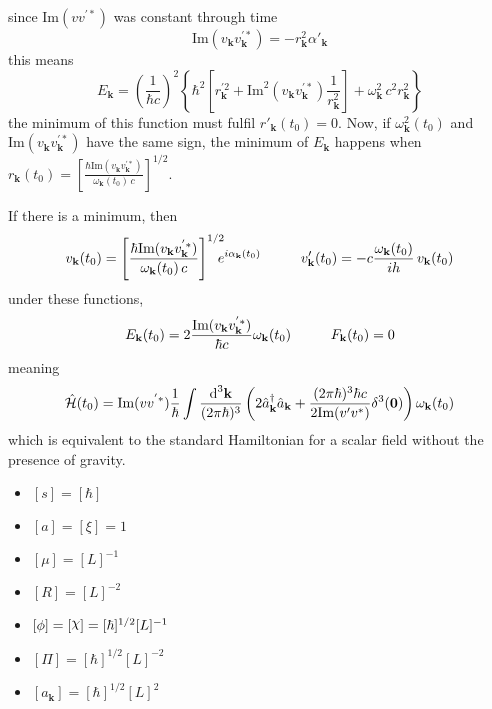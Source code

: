 \documentclass[pt=11, openany,twoside,a4paper]{scrbook}
\DeclareRobustCommand{\rchi}{{\mathpalette\irchi\relax}}
\newcommand{\irchi}[2]{\raisebox{\depth}{$#1\chi$}} %
\begin{document}
	since Im$(vv^{'*})$ was constant through time
	\begin{equation}
		\text{Im}(v_\mathbf{k}v^{'*}_\mathbf{k})=-r_\mathbf{k}^2\alpha'_\mathbf{k}
	\end{equation}
	this means
	\begin{equation}
		E_\mathbf{k}=\left(\frac{1}{\hbar c}\right)^2\left\{\hbar^2\left[r^{'2}_\mathbf{k}+\text{Im}^2\left(v_\mathbf{k}v^{'*}_\mathbf{k}\right)\frac{1}{r_\mathbf{k}^2}\right]+\omega^2_\mathbf{k}\,c^2r_\mathbf{k}^2\right\}
	\end{equation}
	the minimum of this function must fulfil $r'_\mathbf{k}(t_0)=0$. Now, if $\omega_\mathbf{k}^2(t_0)$ and $\text{Im}(v_\mathbf{k}v^{'*}_\mathbf{k})$ have the same sign, the minimum of $E_\mathbf{k}$ happens when $r_\mathbf{k}(t_0)=\left[\frac{\hbar\text{Im}(v_\mathbf{k}v^{'*}_\mathbf{k})}{\omega_\mathbf{k}(t_0)\,c}\right]^{1/2}$.
	
	If there is a minimum, then
	\begin{equation}
		v_\mathbf{k}(t_0)=\left[\frac{\hbar\text{Im}(v_\mathbf{k}v^{'*}_\mathbf{k})}{\omega_\mathbf{k}(t_0)\,c}\right]^{1/2}\!\!\!\!e^{i\alpha_\mathbf{k}(t_0)}\hspace{1.0cm}v'_\mathbf{k}(t_0)=-c\frac{\omega_\mathbf{k}(t_0)}{ih}\,v_\mathbf{k}(t_0)
	\end{equation}
	under these functions,
	\begin{equation}
		E_\mathbf{k}(t_0)=2\frac{\text{Im}(v_\mathbf{k}v^{'*}_\mathbf{k})}{\hbar c}\omega_\mathbf{k}(t_0)\hspace{1.0cm}F_\mathbf{k}(t_0)=0
	\end{equation}
	meaning
	\begin{equation}
		\hat{\mathcal{H}}(t_0)=\text{Im}(vv^{'*})\frac{1}{\hbar}\int\frac{\text{d}^3\mathbf{k}}{(2\pi\hbar)^3}\left(2\hat{a}_\mathbf{k}^\dagger\hat{a}_\mathbf{k}+\frac{(2\pi\hbar)^3\hbar c}{2\text{Im}(v'v^*)}\delta^3(\mathbf{0})\right)\omega_\mathbf{k}(t_0)
	\end{equation}
	which is equivalent to the standard Hamiltonian for a scalar field without the presence of gravity.
	\backmatter
	\appendix
	\begin{itemize}
		\item $[s]=[\hbar]$
		\item $[a]=[\xi]=1$
		\item $[\mu]=[L]^{-1}$
		\item $[R]=[L]^{-2}$
		\item $[\phi]=[\rchi]=[\hbar]^{1/2}[L]^{-1}$
		\item $[\Pi]=[\hbar]^{1/2}[L]^{-2}$
		\item $[a_\mathbf{k}]=[\hbar]^{1/2}[L]^2$
	\end{itemize}
	\nocite{*}
\end{document}
